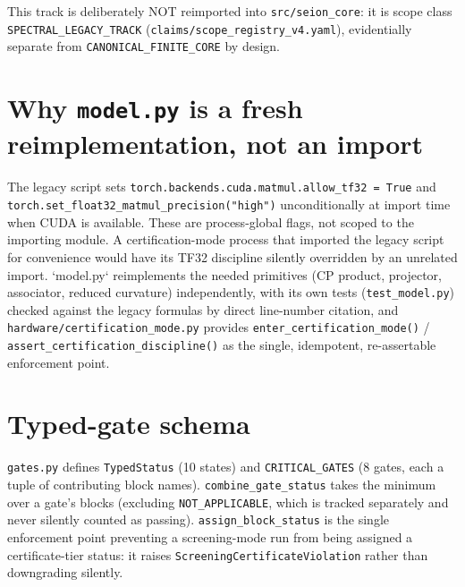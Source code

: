 \documentclass[11pt]{amsart}
\begin{document}
This track is deliberately NOT reimported into \texttt{src/seion\_core}: it
is scope class \texttt{SPECTRAL\_LEGACY\_TRACK}
(\texttt{claims/scope\_registry\_v4.yaml}), evidentially separate from
\texttt{CANONICAL\_FINITE\_CORE} by design.

\section{Why \texttt{model.py} is a fresh reimplementation, not an import}
The legacy script sets \texttt{torch.backends.cuda.matmul.allow\_tf32 =
True} and \texttt{torch.set\_float32\_matmul\_precision("high")}
unconditionally at import time when CUDA is available. These are
process-global flags, not scoped to the importing module. A certification-mode
process that imported the legacy script for convenience would have its
TF32 discipline silently overridden by an unrelated import. `model.py`
reimplements the needed primitives (CP product, projector, associator,
reduced curvature) independently, with its own tests
(\texttt{test\_model.py}) checked against the legacy formulas by direct
line-number citation, and \texttt{hardware/certification\_mode.py}
provides \texttt{enter\_certification\_mode()} / \\
\texttt{assert\_certification\_discipline()} as the single, idempotent,
re-assertable enforcement point.

\section{Typed-gate schema}
\texttt{gates.py} defines \texttt{TypedStatus} (10 states) and
\texttt{CRITICAL\_GATES} (8 gates, each a tuple of contributing block
names). \texttt{combine\_gate\_status} takes the minimum over a gate's
blocks (excluding \texttt{NOT\_APPLICABLE}, which is tracked separately
and never silently counted as passing). \texttt{assign\_block\_status}
is the single enforcement point preventing a screening-mode run from
being assigned a certificate-tier status: it raises
\texttt{ScreeningCertificateViolation} rather than downgrading silently.
\end{document}
